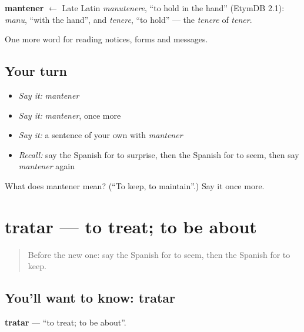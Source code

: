 \begin{cousinweb}
\textbf{mantener} $\leftarrow$ Late Latin \emph{manutenere}, \textquotedblleft{}to hold in the hand\textquotedblright{} (EtymDB 2.1): \emph{manu}, \textquotedblleft{}with the hand\textquotedblright{}, and \emph{tenere}, \textquotedblleft{}to hold\textquotedblright{} — the \emph{tenere} of \emph{tener}.
\end{cousinweb}

\begin{grammarlens}[title={What you've built}]
One more word for reading notices, forms and messages.
\end{grammarlens}

\subsection*{Your turn}
\begin{itemize}
\raggedright
  \item \emph{Say it:} \emph{mantener}
  \item \emph{Say it:} \emph{mantener}, once more
  \item \emph{Say it:} a sentence of your own with \emph{mantener}
  \item \emph{Recall:} say the Spanish for to surprise, then the Spanish for to seem, then say \emph{mantener} again
\end{itemize}

\begin{tcolorbox}[breakable,colback=teal!4,colframe=teal!35!black,title={Before you move on}]
What does mantener mean? (\textquotedblleft{}To keep, to maintain\textquotedblright{}.) Say it once more.
\end{tcolorbox}
\section[tratar]{tratar — to treat; to be about}

\label{lesson:ES-C511-tratar}



\begin{quote}
Before the new one: say the Spanish for to seem, then the Spanish for to keep.
\end{quote}

\subsection*{You'll want to know: tratar}
\textbf{tratar} — \textquotedblleft{}to treat; to be about\textquotedblright{}.

